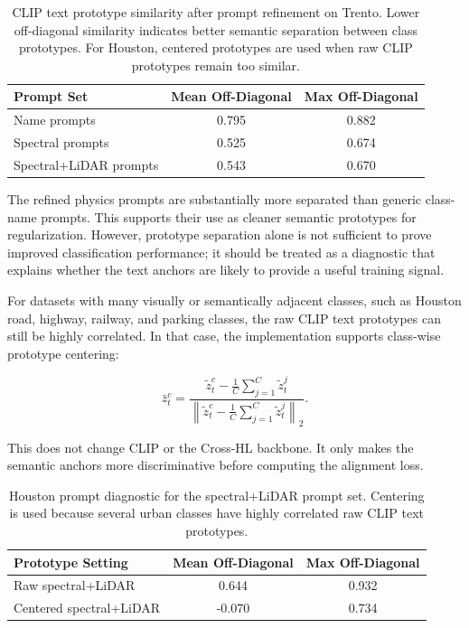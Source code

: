 \documentclass[10pt,journal,compsoc]{IEEEtran}
\begin{document}
\begin{table}[t]
\centering
\caption{CLIP text prototype similarity after prompt refinement on Trento. Lower off-diagonal similarity indicates better semantic separation between class prototypes. For Houston, centered prototypes are used when raw CLIP prototypes remain too similar.}
\label{tab:prompt_similarity}
\begin{tabular}{lcc}
\toprule
\textbf{Prompt Set} & \textbf{Mean Off-Diagonal} & \textbf{Max Off-Diagonal} \\
\midrule
Name prompts & 0.795 & 0.882 \\
Spectral prompts & 0.525 & 0.674 \\
Spectral+LiDAR prompts & 0.543 & 0.670 \\
\bottomrule
\end{tabular}
\end{table}

The refined physics prompts are substantially more separated than generic class-name prompts. This supports their use as cleaner semantic prototypes for regularization. However, prototype separation alone is not sufficient to prove improved classification performance; it should be treated as a diagnostic that explains whether the text anchors are likely to provide a useful training signal.

For datasets with many visually or semantically adjacent classes, such as Houston road, highway, railway, and parking classes, the raw CLIP text prototypes can still be highly correlated. In that case, the implementation supports class-wise prototype centering:

\begin{equation}
\bar{z}_t^c =
\frac{\tilde{z}_t^c - \frac{1}{C}\sum_{j=1}^{C}\tilde{z}_t^j}
{\left\|\tilde{z}_t^c - \frac{1}{C}\sum_{j=1}^{C}\tilde{z}_t^j\right\|_2}.
\end{equation}

This does not change CLIP or the Cross-HL backbone. It only makes the semantic anchors more discriminative before computing the alignment loss.

\begin{table}[t]
\centering
\caption{Houston prompt diagnostic for the spectral+LiDAR prompt set. Centering is used because several urban classes have highly correlated raw CLIP text prototypes.}
\label{tab:houston_centering}
\begin{tabular}{lcc}
\toprule
\textbf{Prototype Setting} & \textbf{Mean Off-Diagonal} & \textbf{Max Off-Diagonal} \\
\midrule
Raw spectral+LiDAR & 0.644 & 0.932 \\
Centered spectral+LiDAR & -0.070 & 0.734 \\
\bottomrule
\end{tabular}
\end{table}
\end{document}
